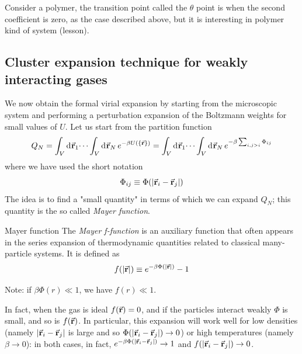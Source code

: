 \documentclass[../main/main.tex]{subfiles}
\begin{document}
\begin{remark}
   Consider a polymer, the transition point called the \( \theta  \) point is when the second coefficient is zero, as the case described above, but it is interesting in polymer kind of system (lesson).
\end{remark}

\subsection{Cluster expansion technique for weakly interacting gases}

We now obtain the formal virial expansion by starting from the microscopic system and performing a perturbation expansion of the Boltzmann weights for small values of \( U \).
Let us start from the partition function
\begin{equation}
  Q_N = \int_{V}^{} \dd[]{\va{r}_1} \dots \int_{V}^{} \dd[]{\va{r}_N}  e^{-\beta U (\{ \va{r} \}  ) } = \int_{V}^{} \dd[]{\va{r}_1} \dots \int_{V}^{} \dd[]{\va{r}_N}  e^{-\beta \sum_{i,j > i}^{} \Phi _{ij} }
\end{equation}
where we have used the short notation
\begin{equation*}
  \Phi _{ij} \equiv \Phi (\abs{\va{r}_i - \va{r}_j} )
\end{equation*}
The idea is to find a "small quantity" in terms of which we can expand \( Q_N \); this quantity is the so called \emph{Mayer function}.
\begin{definition}{Mayer function}{}
  The \emph{Mayer f-function} is an auxiliary function that often appears in the series expansion of thermodynamic quantities related to classical many-particle systems. It is defined as
  \begin{equation}
    f (\abs{\va{r}} ) \equiv e^ { - \beta \Phi ( \abs{\va{r}} )} -1
  \end{equation}
  \begin{remark}
  Note: if \( \beta \Phi (r) \ll 1 \), we have \( f(r) \ll 1 \).
  \end{remark}
\end{definition}
In fact, when the gas is ideal  \( f(\va{r}) = 0 \), and if the particles interact weakly \( \Phi  \) is small, and so is \( f(\va{r})  \).
In particular, this expansion will work well for low densities (namely \( | \va {r}_i - \va{r}_j| \)  is large and so \( \Phi  (|\va {r}_i - \va{r}_j| ) \to 0 \)) or high temperatures (namely \( \beta \to 0  \)): in both cases, in fact, \( e^{-\beta  \Phi  (|\va {r}_i - \va{r}_j| )} \rightarrow 1 \) and \( f  (|\va {r}_i - \va{r}_j| ) \to 0 \).
\end{document}
